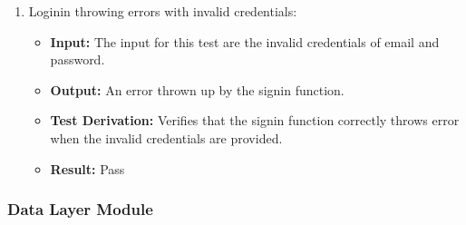 \documentclass[12pt, titlepage]{article}
\begin{document}
\begin{enumerate}
    \item Loginin throwing errors with invalid credentials:
      \begin{itemize}
        \item \textbf{Input:} The input for this test are the invalid credentials of email and password. 
        \item \textbf{Output:} An error thrown up by the signin function.
        \item \textbf{Test Derivation:} Verifies that the signin function correctly throws error when the invalid credentials are provided.
        \item \textbf{Result:} Pass 
      \end{itemize}
  \end{enumerate}


\subsubsection{Data Layer Module}
\end{document}
